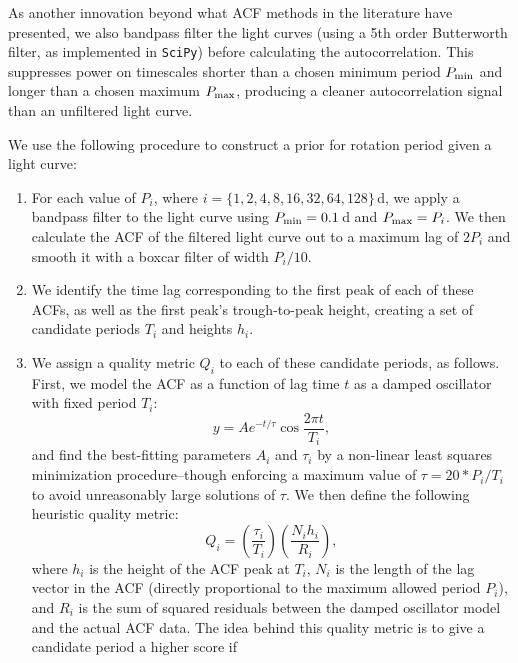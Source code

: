 \documentclass[a4paper,fleqn,usenatbib,useAMS]{mnras}
\begin{document}
As another innovation beyond what ACF methods in the literature have
presented, we also bandpass filter the light curves (using a 5th order
Butterworth filter, as implemented in \texttt{SciPy}) before calculating the
autocorrelation.  This suppresses power on timescales shorter than a chosen
minimum period $P_{\rm min}$ and longer than a chosen maximum $P_{\rm max}$,
producing a cleaner autocorrelation signal than an unfiltered light curve.

We use the following procedure to construct a prior for rotation period
given a light curve:

\begin{enumerate}
\item{For each value of $P_i$, where $i = \{1, 2, 4, 8, 16, 32, 64, 128\}$\,d,
we apply a bandpass filter to the light curve using $P_{\rm min}=0.1$\,d
and $P_{\rm max} = P_i$.  We then calculate the ACF of the filtered
light curve out to a maximum lag of $2P_i$ and smooth it with a boxcar
filter of width $P_i/10$.}

\item{We identify the time lag corresponding to the
first peak of each of these ACFs, as well as the first peak's
trough-to-peak height, creating a set of candidate periods
$T_i$ and heights $h_i$.}

\item{We assign a quality metric $Q_i$ to each of these candidate
periods, as follows.  First, we model the ACF as a function of lag
time $t$ as a damped oscillator with fixed period $T_i$:
\begin{equation}
y = A e^{-t/\tau} \cos{\frac{2\pi t}{T_i} },
\end{equation}
and find the best-fitting parameters $A_i$ and $\tau_i$ by a non-linear
least squares minimization procedure--though enforcing a maximum
value of $\tau = 20 * P_i/T_i$ to avoid unreasonably
large solutions of $\tau$.
We then define the following heuristic quality metric:
\begin{equation}
\label{eq:quality}
Q_i = \left(\frac{\tau_i}{T_i}\right) \left(\frac{N_i h_i}{R_i}\right),
\end{equation}
where $h_i$ is the height of the ACF peak at $T_i$,
$N_i$ is the length of the lag vector in the ACF (directly proportional
to the maximum allowed period $P_i$),
and $R_i$ is the sum of squared residuals between the
damped oscillator model and the actual ACF data.  The idea behind this
quality metric is to give a candidate period a higher score if

}
\end{enumerate}
\end{document}
